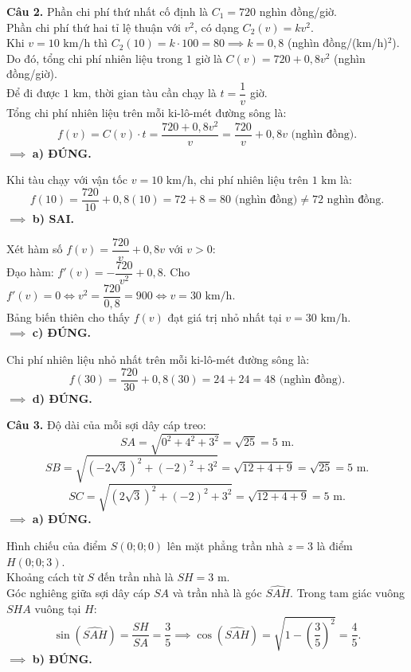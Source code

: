 \documentclass[12pt,a4paper]{article}
\begin{document}
\vspace{0.3cm}
\noindent\textbf{Câu 2.}
Phần chi phí thứ nhất cố định là $C_1 = 720$ nghìn đồng/giờ.\\
Phần chi phí thứ hai tỉ lệ thuận với $v^2$, có dạng $C_2(v) = k v^2$.\\
Khi $v = 10\text{ km/h}$ thì $C_2(10) = k \cdot 100 = 80 \implies k = 0{,}8$ (nghìn đồng/(km/h)$^2$).\\
Do đó, tổng chi phí nhiên liệu trong $1$ giờ là $C(v) = 720 + 0{,}8v^2$ (nghìn đồng/giờ).\\
Để đi được $1\text{ km}$, thời gian tàu cần chạy là $t = \dfrac{1}{v}$ giờ.\\
Tổng chi phí nhiên liệu trên mỗi ki-lô-mét đường sông là:
\[
f(v) = C(v) \cdot t = \dfrac{720 + 0{,}8v^2}{v} = \dfrac{720}{v} + 0{,}8v\text{ (nghìn đồng)}.
\]
$\implies$ \textbf{a) ĐÚNG.}

Khi tàu chạy với vận tốc $v = 10\text{ km/h}$, chi phí nhiên liệu trên $1\text{ km}$ là:
\[
f(10) = \dfrac{720}{10} + 0{,}8(10) = 72 + 8 = 80\text{ (nghìn đồng)} \ne 72\text{ nghìn đồng}.
\]
$\implies$ \textbf{b) SAI.}

Xét hàm số $f(v) = \dfrac{720}{v} + 0{,}8v$ với $v > 0$:\\
Đạo hàm: $f'(v) = -\dfrac{720}{v^2} + 0{,}8$. Cho $f'(v) = 0 \iff v^2 = \dfrac{720}{0{,}8} = 900 \iff v = 30\text{ km/h}$.\\
Bảng biến thiên cho thấy $f(v)$ đạt giá trị nhỏ nhất tại $v = 30\text{ km/h}$.\\
$\implies$ \textbf{c) ĐÚNG.}

Chi phí nhiên liệu nhỏ nhất trên mỗi ki-lô-mét đường sông là:
\[
f(30) = \dfrac{720}{30} + 0{,}8(30) = 24 + 24 = 48\text{ (nghìn đồng)}.
\]
$\implies$ \textbf{d) ĐÚNG.}

\vspace{0.3cm}
\noindent\textbf{Câu 3.}
Độ dài của mỗi sợi dây cáp treo:
\[
SA = \sqrt{0^2 + 4^2 + 3^2} = \sqrt{25} = 5\text{ m}.
\]
\[
SB = \sqrt{(-2\sqrt{3})^2 + (-2)^2 + 3^2} = \sqrt{12 + 4 + 9} = \sqrt{25} = 5\text{ m}.
\]
\[
SC = \sqrt{(2\sqrt{3})^2 + (-2)^2 + 3^2} = \sqrt{12 + 4 + 9} = 5\text{ m}.
\]
$\implies$ \textbf{a) ĐÚNG.}

Hình chiếu của điểm $S(0; 0; 0)$ lên mặt phẳng trần nhà $z = 3$ là điểm $H(0; 0; 3)$.\\
Khoảng cách từ $S$ đến trần nhà là $SH = 3\text{ m}$.\\
Góc nghiêng giữa sợi dây cáp $SA$ và trần nhà là góc $\widehat{SAH}$. Trong tam giác vuông $SHA$ vuông tại $H$:
\[
\sin(\widehat{SAH}) = \dfrac{SH}{SA} = \dfrac{3}{5} \implies \cos(\widehat{SAH}) = \sqrt{1 - \left(\dfrac{3}{5}\right)^2} = \dfrac{4}{5}.
\]
$\implies$ \textbf{b) ĐÚNG.}
\end{document}
